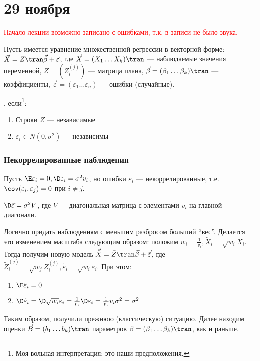 \chapter{29 ноября}

\textcolor{red}{Начало лекции возможно записано с ошибками, т.к. в записи не было звука.}

Пусть имеется уравнение множественной регрессии в векторной форме: \(\vec{X} = Z\tran \vec{\beta} + \vec{\varepsilon}\), где \(\vec{X} = (X_1 \dots X_k)\tran\) --- наблюдаемые значения переменной, \(Z = \left(Z_i^{(j)}\right)\) --- матрица плана, \(\vec{\beta} = (\beta_1 \dots \beta_k)\tran\) --- \? коэффициенты, \(\vec{\varepsilon} = (\varepsilon_1 \dots \varepsilon_n)\) --- \? ошибки (случайные).

\?, если\footnote{Моя вольная интерпретация: это наши предположения.}:
\begin{enumerate}
    \item Строки \(Z\) --- \? независимые
    \item \(\varepsilon_i \in N(0, \sigma^2)\) --- независимы
\end{enumerate}

\subsection{Некоррелированные наблюдения}

Пусть \(\E \varepsilon_i = 0, \D \varepsilon_i = \sigma^2 v_i\), но ошибки \(\varepsilon_i\) --- некоррелированные, т.е. \(\cov(\varepsilon_i, \varepsilon_j) = 0\) при \(i \neq j\).

\(\D \vec{\varepsilon} = \sigma^2 V\), где \(V\) --- диагональная матрица с элементами \(v_i\) на главной диагонали.

\begin{remark}
    Логично придать наблюдениям с меньшим разбросом больший ``вес''. Делается это изменением масштаба следующим образом: положим \(w_i = \frac{1}{v_i}, \tilde{X}_i = \sqrt{w_i} X_i\). Тогда получим новую модель \(\vec{\tilde{X}} = \tilde{Z}\tran \vec{\beta} + \vec{\tilde{\varepsilon}}\), где \(\tilde{Z}^{(j)}_i = \sqrt{w_j} Z_i^{(j)}, \tilde{\varepsilon}_i = \sqrt{w_i} \varepsilon_i\). При этом:
    \begin{enumerate}
        \item \(\E \tilde{\varepsilon}_i = 0\)
        \item \(\D \tilde{\varepsilon}_i = \D \sqrt{w_i} \varepsilon_i = \frac{1}{v_i} \D \varepsilon_i = \frac{1}{v_i} v_i \sigma^2 = \sigma^2\)
    \end{enumerate}
    Таким образом, получили прежнюю (классическую) ситуацию. Далее находим оценки \(\vec{B} = (b_1 \dots b_k)\tran\) параметров \(\beta = (\beta_1 \dots \beta_k)\tran\), как и раньше.
\end{remark}

